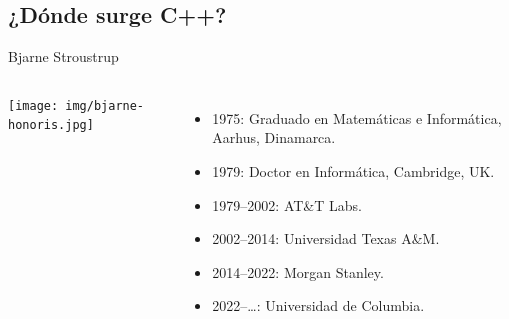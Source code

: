 \subsection{¿Dónde surge C++?}


\begin{frame}[t,fragile]{Bjarne Stroustrup}
\begin{columns}

\texttt{[image: img/bjarne-honoris.jpg]}

\begin{itemize}
  \item 1975: Graduado en Matemáticas e Informática, Aarhus, Dinamarca.
  \item 1979: Doctor en Informática, Cambridge, UK.
  \item 1979--2002: AT\&T Labs.
  \item 2002--2014: Universidad Texas A\&M.
  \item 2014--2022: Morgan Stanley.
  \item 2022--\ldots: Universidad de Columbia.
\end{itemize}

\end{columns}
\end{frame}
